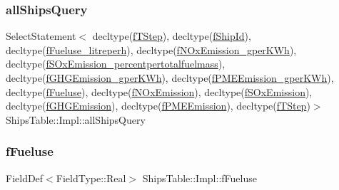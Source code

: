 \subsubsection{\texorpdfstring{allShipsQuery}{allShipsQuery}}
{\footnotesize\ttfamily Select\+Statement$<$ decltype(\mbox{\hyperlink{struct_ships_table_1_1_impl_a5349975645b3eb74fe50510c44cc7ffb}{f\+T\+Step}}), decltype(\mbox{\hyperlink{struct_ships_table_1_1_impl_a50136df8b124ebd45e97142ee1e0e19e}{f\+Ship\+Id}}), decltype(\mbox{\hyperlink{struct_ships_table_1_1_impl_a74262a4b0a8c274d4c6d2b865f166a4f}{f\+Fueluse\+\_\+litreperh}}), decltype(\mbox{\hyperlink{struct_ships_table_1_1_impl_ac0c35c7a9d264fc3269376e25c173718}{f\+N\+Ox\+Emission\+\_\+gper\+K\+Wh}}), decltype(\mbox{\hyperlink{struct_ships_table_1_1_impl_afb5a137533b442216a6ee10fb6d0c5f7}{f\+S\+Ox\+Emission\+\_\+percentpertotalfuelmass}}), decltype(\mbox{\hyperlink{struct_ships_table_1_1_impl_a1ab1d9871411b949d1c0aa2094def1ad}{f\+G\+H\+G\+Emission\+\_\+gper\+K\+Wh}}), decltype(\mbox{\hyperlink{struct_ships_table_1_1_impl_a6ca431ea16c9cc70afb8a37e844fd7d3}{f\+P\+M\+E\+Emission\+\_\+gper\+K\+Wh}}), decltype(\mbox{\hyperlink{struct_ships_table_1_1_impl_a92d2ff078567c54fd9caaea72b3a2b66}{f\+Fueluse}}), decltype(\mbox{\hyperlink{struct_ships_table_1_1_impl_a0cf4f3a3fef002e3fcf44cad3652ed39}{f\+N\+Ox\+Emission}}), decltype(\mbox{\hyperlink{struct_ships_table_1_1_impl_a81b4ad6a2480a51ac1fe59072ea48f08}{f\+S\+Ox\+Emission}}), decltype(\mbox{\hyperlink{struct_ships_table_1_1_impl_ab0f4e9ae1ef2729926f1f9f2130e31f3}{f\+G\+H\+G\+Emission}}), decltype(\mbox{\hyperlink{struct_ships_table_1_1_impl_a6e5837ad78a1a253dd1289ff1d73ce80}{f\+P\+M\+E\+Emission}}), decltype(\mbox{\hyperlink{struct_ships_table_1_1_impl_a5349975645b3eb74fe50510c44cc7ffb}{f\+T\+Step}})$>$ Ships\+Table\+::\+Impl\+::all\+Ships\+Query}

\mbox{\label{struct_ships_table_1_1_impl_a92d2ff078567c54fd9caaea72b3a2b66}} 
\subsubsection{\texorpdfstring{fFueluse}{fFueluse}}
{\footnotesize\ttfamily Field\+Def$<$Field\+Type\+::\+Real$>$ Ships\+Table\+::\+Impl\+::f\+Fueluse}

\mbox{\label{struct_ships_table_1_1_impl_a74262a4b0a8c274d4c6d2b865f166a4f}} 
